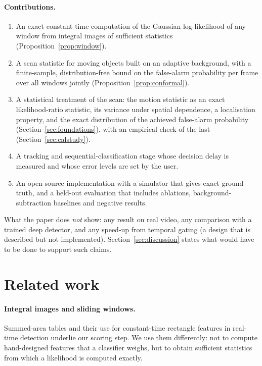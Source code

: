 \documentclass[11pt,a4paper]{article}
\theoremstyle{definition}
\begin{document}
\paragraph{Contributions.}
\begin{enumerate}[label=(\arabic*),leftmargin=*]
\item An exact constant-time computation of the Gaussian log-likelihood of any window from integral images of sufficient statistics (Proposition~\ref{prop:window}).
\item A scan statistic for moving objects built on an adaptive background, with a finite-sample, distribution-free bound on the false-alarm probability per frame over all windows jointly (Proposition~\ref{prop:conformal}).
\item A statistical treatment of the scan: the motion statistic as an exact likelihood-ratio statistic, its variance under spatial dependence, a localisation property, and the exact distribution of the achieved false-alarm probability (Section~\ref{sec:foundations}), with an empirical check of the last (Section~\ref{sec:calstudy}).
\item A tracking and sequential-classification stage whose decision delay is measured and whose error levels are set by the user.
\item An open-source implementation with a simulator that gives exact ground truth, and a held-out evaluation that includes ablations, background-subtraction baselines and negative results.
\end{enumerate}
What the paper does \emph{not} show: any result on real video, any comparison with a trained deep detector, and any speed-up from temporal gating (a design that is described but not implemented).
Section~\ref{sec:discussion} states what would have to be done to support such claims.

\section{Related work}\label{sec:related}
\paragraph{Integral images and sliding windows.}
Summed-area tables \cite{crow1984} and their use for constant-time rectangle features in real-time detection \cite{viola2004} underlie our scoring step.
We use them differently: not to compute hand-designed features that a classifier weighs, but to obtain sufficient statistics from which a likelihood is computed exactly.
\end{document}
